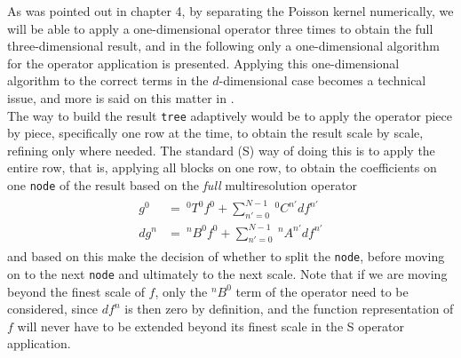 \noindent
As was pointed out in chapter 4, by separating the Poisson kernel
numerically, we will be able to apply a one-dimensional operator three
times to obtain the full three-dimensional result, and in the following only a
one-dimensional algorithm for the operator application is presented.
Applying this one-dimensional algorithm to the correct terms in the
$d$-dimensional case becomes a technical issue, and more is said on this
matter in \cite{Fossgaard}.\\

\noindent
The way to build the
result \texttt{tree} adaptively would be to apply the operator piece by piece,
specifically one row at the time, to obtain the result scale by scale,
refining only where needed. The standard (S) way of doing this is to apply the
entire row, that is, applying all blocks on one row, to obtain the
coefficients on one \texttt{node} of the result based on the \emph{full}
multiresolution operator
\begin{align}
	\label{eq:Sadapoper}
	\begin{split}
	g^0  &=\ ^0T^0f^0 + \sum_{n'=0}^{N-1}\ ^0C^{n'}df^{n'}\\
	dg^n &=\ ^nB^0f^0 + \sum_{n'=0}^{N-1}\ ^nA^{n'}df^{n'}
	\end{split}
\end{align}
and based on this make the decision of whether to split the \texttt{node}, 
before moving on to the next \texttt{node} and ultimately to the next scale.
Note that if we are moving beyond the finest scale of $f$, only the $^nB^0$
term of the operator need to be considered, since $df^n$ is then zero by
definition, and the function representation of $f$ will never have to be 
extended beyond its finest scale in the S operator application.

